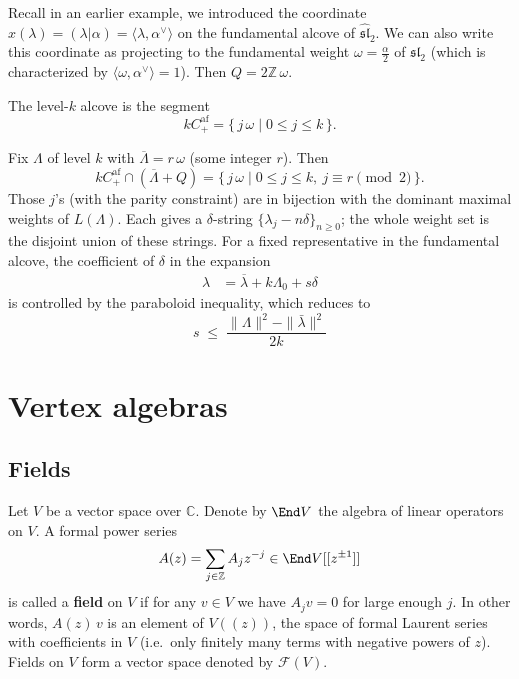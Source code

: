 \documentclass[12pt]{article}
\begin{document}
\begin{example}
     Recall in an earlier example, we introduced the coordinate $x(\lambda) = (\lambda|\alpha) = \langle \lambda, \alpha^\vee \rangle$ on the fundamental alcove of $\widehat{\mathfrak{sl}}_2$. We can also write this coordinate as projecting to the fundamental weight $\omega = \frac{\alpha}{2}$ of $\mathfrak{sl}_2$ (which is characterized by $\langle \omega, \alpha^\vee \rangle = 1$). Then $Q=2\mathbb{Z}\,\omega$.

    The level-$k$ alcove is the segment
    \[
        kC^{\text{af}}_+ = \{\, j\,\omega \mid 0\le j\le k \,\}.
    \]

    Fix $\Lambda$ of level $k$ with $\overline{\Lambda}=r\,\omega$ (some integer $r$). Then
    \[
        kC^{\text{af}}_+\cap(\overline{\Lambda}+Q) = \{\, j\,\omega \mid 0\le j\le k,\ j\equiv r\pmod{2}\,\}.
    \]
    Those $j$'s (with the parity constraint) are in bijection with the dominant maximal weights of $L(\Lambda)$. Each gives a $\delta$-string $\{\lambda_j-n\delta\}_{n\ge0}$; the whole weight set is the disjoint union of these strings. For a fixed representative in the fundamental alcove, the coefficient of $\delta$ in the expansion \begin{align*}
        \lambda & = \overline{\lambda} + k\Lambda_0 + s \delta
    \end{align*} is controlled by the paraboloid inequality, which reduces to \[
        s\;\le\;\frac{\|\Lambda\|^2-\|\bar\lambda\|^2}{2k}
    \]
\end{example}

\section{Vertex algebras}
\subsection{Fields}
Let $V$ be a vector space over $\mathbb{C}$. Denote by $\End V$ the algebra of linear operators on $V$.
A formal power series
\begin{equation}\label{eq:field}
    A(z) = \sum_{j \in \mathbb{Z}} A_j z^{-j} \in \End V[[z^{\pm1}]]
\end{equation}
is called a \textbf{field} on $V$ if for any $v \in V$ we have $A_j v = 0$ for large enough $j$.
In other words, $A(z)\,v$ is an element of $V((z))$, the space of formal Laurent series with coefficients in $V$ (i.e.\ only finitely many terms with negative powers of $z$).
Fields on $V$ form a vector space denoted by $\mathcal{F}(V)$.
\end{document}
